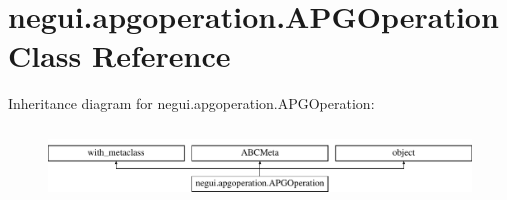 \hypertarget{classnegui_1_1apgoperation_1_1APGOperation}{}\section{negui.\+apgoperation.\+A\+P\+G\+Operation Class Reference}
\label{classnegui_1_1apgoperation_1_1APGOperation}
Inheritance diagram for negui.\+apgoperation.\+A\+P\+G\+Operation\+:\begin{figure}[H]
\begin{center}
\leavevmode
\includegraphics[height=2.000000cm]{classnegui_1_1apgoperation_1_1APGOperation}
\end{center}
\end{figure}
